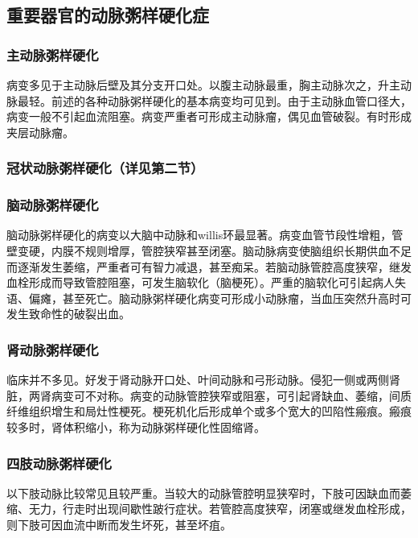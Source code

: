 \subsection{重要器官的动脉粥样硬化症}

\subsubsection{主动脉粥样硬化}

病变多见于主动脉后壁及其分支开口处。以腹主动脉最重，胸主动脉次之，升主动脉最轻。前述的各种动脉粥样硬化的基本病变均可见到。由于主动脉血管口径大，病变一般不引起血流阻塞。病变严重者可形成主动脉瘤，偶见血管破裂。有时形成夹层动脉瘤。

\subsubsection{冠状动脉粥样硬化（详见第二节）}

\subsubsection{脑动脉粥样硬化}

脑动脉粥样硬化的病变以大脑中动脉和willis环最显著。病变血管节段性增粗，管壁变硬，内膜不规则增厚，管腔狭窄甚至闭塞。脑动脉病变使脑组织长期供血不足而逐渐发生萎缩，严重者可有智力减退，甚至痴呆。若脑动脉管腔高度狭窄，继发血栓形成而导致管腔阻塞，可发生脑软化（脑梗死）。严重的脑软化可引起病人失语、偏瘫，甚至死亡。脑动脉粥样硬化病变可形成小动脉瘤，当血压突然升高时可发生致命性的破裂出血。

\subsubsection{肾动脉粥样硬化}

临床并不多见。好发于肾动脉开口处、叶间动脉和弓形动脉。侵犯一侧或两侧肾脏，两肾病变可不对称。病变的动脉管腔狭窄或阻塞，可引起肾缺血、萎缩，间质纤维组织增生和局灶性梗死。梗死机化后形成单个或多个宽大的凹陷性瘢痕。瘢痕较多时，肾体积缩小，称为动脉粥样硬化性固缩肾。

\subsubsection{四肢动脉粥样硬化}

以下肢动脉比较常见且较严重。当较大的动脉管腔明显狭窄时，下肢可因缺血而萎缩、无力，行走时出现间歇性跛行症状。若管腔高度狭窄，闭塞或继发血栓形成，则下肢可因血流中断而发生坏死，甚至坏疽。

